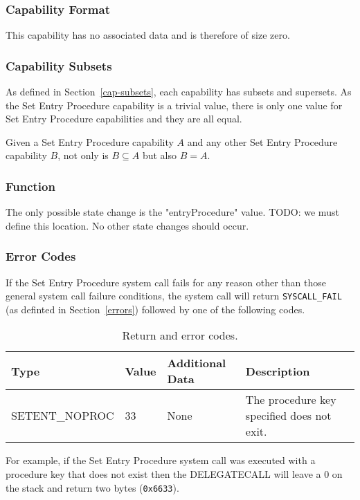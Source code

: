 \documentclass[english,a4paper]{article}
\let\oldparagraph\subsubsection
\renewcommand{\subsubsection}[1]{\oldparagraph{#1}\mbox{}}
\begin{document}
\subsubsection{Capability Format}
This capability has no associated data and is therefore of size zero.

\subsubsection{Capability Subsets}
As defined in Section~\ref{cap-subsets}, each capability has subsets and
supersets. As the Set Entry Procedure capability is a trivial value, there is
only one value for Set Entry Procedure capabilities and they are all equal.

Given a Set Entry Procedure capability $A$ and any other Set Entry Procedure
capability $B$, not only is $B \subseteq A$ but also $B = A$.

\subsubsection{Function}
The only possible state change is the "entryProcedure" value. TODO: we must
define this location. No other state changes should occur.

\subsubsection{Error Codes}
If the Set Entry Procedure system call fails for any reason other than those
general system call failure conditions, the system call will return
\texttt{SYSCALL\_FAIL} (as definted in Section~\ref{errors}) followed by one of
the following codes.

\begin{table}[H]
  \caption{Return and error codes.}
  \centering{}%
  \begin{tabular}{l|l|p{}|p{}}
    \hline
    Type & Value & Additional Data & Description\tabularnewline
    \hline
    \hline
    SETENT\_NOPROC  & 33 & None & The procedure key specified does not exit.
      \tabularnewline
    \hline
  \end{tabular}
\end{table}

For example, if the Set Entry
Procedure system call was executed with a procedure key that does not exist then
the DELEGATECALL will leave a 0 on the stack and return two bytes
(\texttt{0x6633}).
\end{document}
